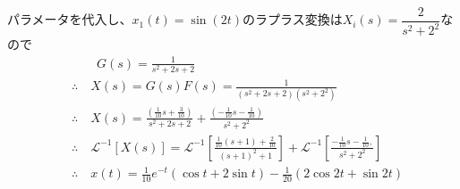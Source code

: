 \documentclass[a4paper,12pt]{article}
\begin{document}
\begin{tcolorbox}[title={4. (7)\(m=1,d=2,k_1=1,k_2=1\)とし、入力変位\(x_1(t)=\sin(2t)\)を与えたときの応
\indent \quad 答を求めよ。 }]
パラメータを代入し、\(x_1(t)=\sin(2t)\)のラプラス変換は\(X_i(s)=\dfrac{2}{s^2+2^2}\)なので
    \vspace{-4mm}
    \begin{align*}
        &\qquad G(s) = \frac{1}{s^2 + 2s+ 2} \\
        &\therefore \quad X(s) = G(s) F(s) = \frac{1}{(s^2 + 2s+ 2)(s^2+2^2)} \\
        &\therefore \quad X(s) =  \frac{\left(\frac{1}{10}s+\frac{3}{10}\right)}{s^2 + 2s+ 2} 
        + \frac{\left(-\frac{1}{10}s-\frac{1}{10}\right)}{s^2+2^2}\\
        &\therefore \quad \mathcal{L}^{-1} \left[ X(s)\right] 
        = \mathcal{L}^{-1} \left[\frac{\frac{1}{10}(s+1)+\frac{2}{10}}{(s+1)^2 + 1}   \right]
        + \mathcal{L}^{-1} \left[\frac{-\frac{1}{10}s-\frac{1}{10},
        }{s^2+2^2} \right] \\
        &\therefore \quad x(t) = \frac{1}{10} e^{-t}( \cos t+2 \sin t) - \frac{1}{20} (2 \cos 2t + \sin 2t)
    \end{align*}
\end{tcolorbox}


\newpage
\end{document}
